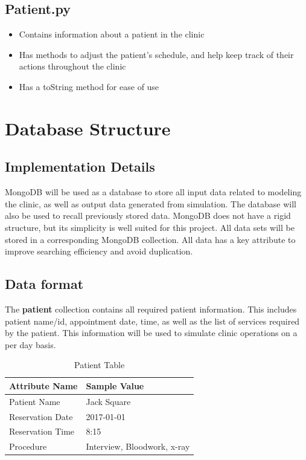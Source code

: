 \documentclass[12pt]{article}
\begin{document}
\subsection{Patient.py}
\begin{itemize}  
\item Contains information about a patient in the clinic
\item Has methods to adjust the patient's schedule, and help keep track of their actions throughout the clinic
\item Has a toString method for ease of use
\end{itemize}




\section{Database Structure}

\subsection{Implementation Details}
MongoDB will be used as a database to store all input data related to modeling the clinic, as well as output data generated from simulation. The database will also be used to recall previously stored data. MongoDB does not have a rigid structure, but its simplicity is well suited for this project. All data sets will be stored in a corresponding MongoDB collection. All data has a key attribute to improve searching efficiency and avoid duplication.

\subsection{Data format}
The \textbf{patient} collection contains all required patient information. This includes patient name/id, appointment date, time, as well as the list of services required by the patient. This information will be used to simulate clinic operations on a per day basis.
\begin{table}[H]
\centering
\caption{Patient Table}
\label{patient-table}
\begin{tabular}{|l|l|}
\hline
Attribute Name   & Sample Value                \\ \hline
Patient Name     & Jack Square                 \\ \hline
Reservation Date & 2017-01-01                  \\ \hline
Reservation Time & 8:15                        \\ \hline
Procedure        & Interview, Bloodwork, x-ray \\ \hline
\end{tabular}
\end{table}
\hfill
\end{document}
